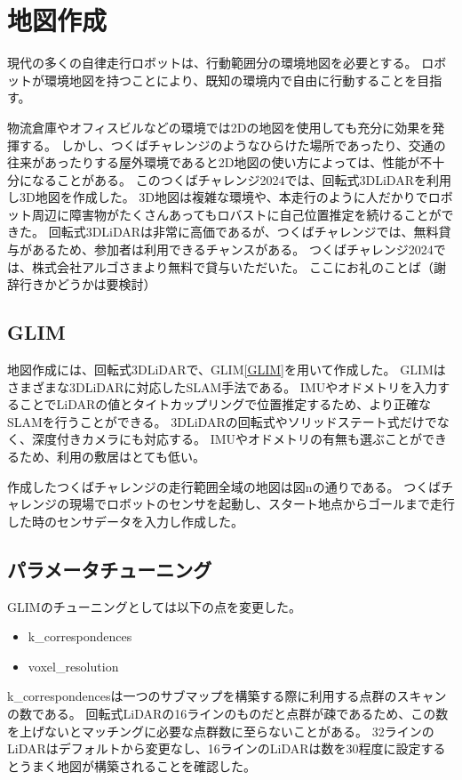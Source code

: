 \section{地図作成}
現代の多くの自律走行ロボットは、行動範囲分の環境地図を必要とする。
ロボットが環境地図を持つことにより、既知の環境内で自由に行動することを目指す。

物流倉庫やオフィスビルなどの環境では2Dの地図を使用しても充分に効果を発揮する。
しかし、つくばチャレンジのようなひらけた場所であったり、交通の往来があったりする屋外環境であると2D地図の使い方によっては、性能が不十分になることがある。
このつくばチャレンジ2024では、回転式3DLiDARを利用し3D地図を作成した。
3D地図は複雑な環境や、本走行のように人だかりでロボット周辺に障害物がたくさんあってもロバストに自己位置推定を続けることができた。
回転式3DLiDARは非常に高価であるが、つくばチャレンジでは、無料貸与があるため、参加者は利用できるチャンスがある。
つくばチャレンジ2024では、株式会社アルゴさまより無料で貸与いただいた。
ここにお礼のことば（謝辞行きかどうかは要検討）

\subsection{GLIM}
地図作成には、回転式3DLiDARで、GLIM\ref{GLIM}を用いて作成した。
GLIMはさまざまな3DLiDARに対応したSLAM手法である。
IMUやオドメトリを入力することでLiDARの値とタイトカップリングで位置推定するため、より正確なSLAMを行うことができる。
3DLiDARの回転式やソリッドステート式だけでなく、深度付きカメラにも対応する。
IMUやオドメトリの有無も選ぶことができるため、利用の敷居はとても低い。

作成したつくばチャレンジの走行範囲全域の地図は図nの通りである。
つくばチャレンジの現場でロボットのセンサを起動し、スタート地点からゴールまで走行した時のセンサデータを入力し作成した。

\subsection{パラメータチューニング}
GLIMのチューニングとしては以下の点を変更した。
\begin{itemize}
    \item k\_correspondences
    \item voxel\_resolution
\end{itemize}

k\_correspondencesは一つのサブマップを構築する際に利用する点群のスキャンの数である。
回転式LiDARの16ラインのものだと点群が疎であるため、この数を上げないとマッチングに必要な点群数に至らないことがある。
32ラインのLiDARはデフォルトから変更なし、16ラインのLiDARは数を30程度に設定するとうまく地図が構築されることを確認した。

